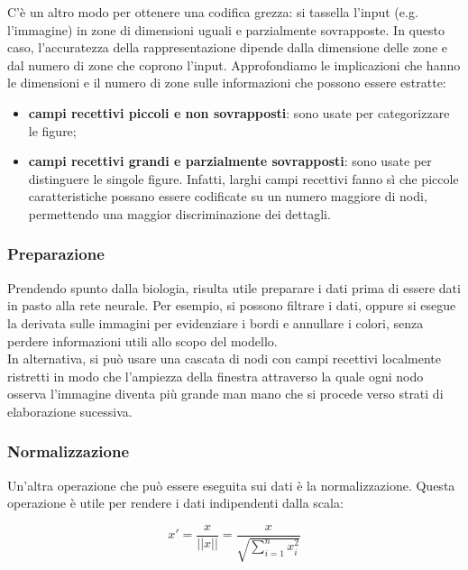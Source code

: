 C'è un altro modo per ottenere una codifica grezza: si tassella l'input (e.g.
l'immagine) in zone di dimensioni uguali e parzialmente sovrapposte. In questo
caso, l'accuratezza della rappresentazione dipende dalla dimensione delle zone e
dal numero di zone che coprono l'input. Approfondiamo le implicazioni che hanno
le dimensioni e il numero di zone sulle informazioni che possono essere
estratte:
\begin{itemize}
	\item \textbf{campi recettivi piccoli e non sovrapposti}: sono usate per
	      categorizzare le figure;

	\item \textbf{campi recettivi grandi e parzialmente sovrapposti}: sono usate
	      per distinguere le singole figure. Infatti, larghi campi recettivi
	      fanno sì che piccole caratteristiche possano essere codificate su un
	      numero maggiore di nodi, permettendo una maggior discriminazione dei
	      dettagli.
\end{itemize}

\subsubsection{Preparazione}

Prendendo spunto dalla biologia, risulta utile preparare i dati prima di essere
dati in pasto alla rete neurale. Per esempio, si possono filtrare i dati, oppure
si esegue la derivata sulle immagini per evidenziare i bordi e annullare i
colori, senza perdere informazioni utili allo scopo del modello.\\
In alternativa, si può usare una cascata di nodi con campi recettivi localmente
ristretti in modo che l'ampiezza della finestra attraverso la quale ogni nodo
osserva l'immagine diventa più grande man mano che si procede verso strati di
elaborazione sucessiva.

\subsubsection{Normalizzazione}

Un'altra operazione che può essere eseguita sui dati è la normalizzazione.
Questa operazione è utile per rendere i dati indipendenti dalla scala:

\begin{equation*}
	x' = \frac{x}{||x||} = \frac{x}{\sqrt{\sum_{i=1}^{n} x_i^2}}
\end{equation*}

